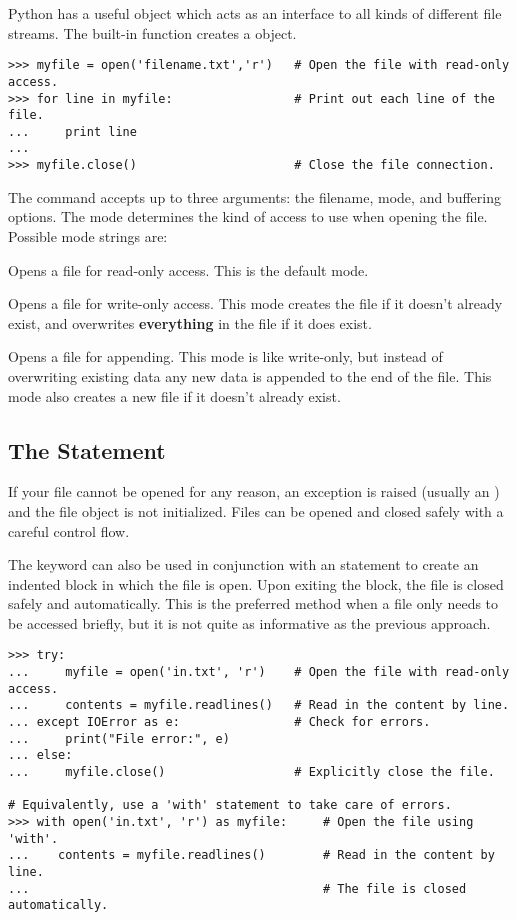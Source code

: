Python has a useful  object which acts as an interface to all kinds of different file streams.
The built-in function  creates a  object.

\begin{lstlisting}
>>> myfile = open('filename.txt','r')   # Open the file with read-only access.
>>> for line in myfile:                 # Print out each line of the file.
...     print line
...
>>> myfile.close()                      # Close the file connection.
\end{lstlisting}

The  command accepts up to three arguments: the filename, mode, and buffering options.
The mode determines the kind of access to use when opening the file.
Possible mode strings are:
\begin{description}
\item {} Opens a file for read-only access.
This is the default mode.
\item {} Opens a file for write-only access.
This mode creates the file if it doesn't already exist, and overwrites \textbf{everything} in the file if it does exist.
\item {} Opens a file for appending.
This mode is like write-only, but instead of overwriting existing data any new data is appended to the end of the file.
This mode also creates a new file if it doesn't already exist.
\end{description}

\subsection*{The  Statement}

If your file cannot be opened for any reason, an exception is raised (usually an ) and the file object is not initialized.
Files can be opened and closed safely with a careful    control flow.

The keyword  can also be used in conjunction with an  statement to create an indented block in which the file is open.
Upon exiting the block, the file is closed safely and automatically.
This is the preferred method when a file only needs to be accessed briefly, but it is not quite as informative as the previous approach.

\begin{lstlisting}
>>> try:
...     myfile = open('in.txt', 'r')    # Open the file with read-only access.
...     contents = myfile.readlines()   # Read in the content by line.
... except IOError as e:                # Check for errors.
...     print("File error:", e)
... else:
...     myfile.close()                  # Explicitly close the file.

# Equivalently, use a 'with' statement to take care of errors.
>>> with open('in.txt', 'r') as myfile:     # Open the file using 'with'.
...    contents = myfile.readlines()        # Read in the content by line.
...                                         # The file is closed automatically.
\end{lstlisting}

